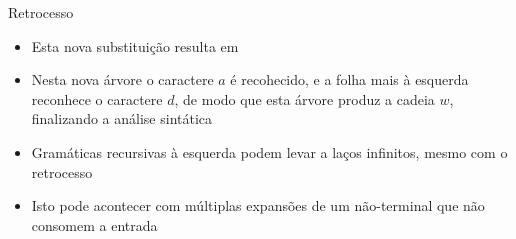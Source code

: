 \begin{frame}[fragile]{Retrocesso}

    \begin{itemize}
        \item Esta nova substituição resulta em
        \begin{center}
        \end{center}
        \pause

        \item Nesta nova árvore o caractere $a$ é recohecido, e a folha mais à esquerda reconhece o caractere $d$, de modo que esta árvore produz a cadeia $w$,
            finalizando a análise sintática
        \pause

        \item Gramáticas recursivas à esquerda podem levar a laços infinitos, mesmo com o retrocesso
        \pause

        \item Isto pode acontecer com múltiplas expansões de um não-terminal que não consomem a entrada
    \end{itemize}
\end{frame}

